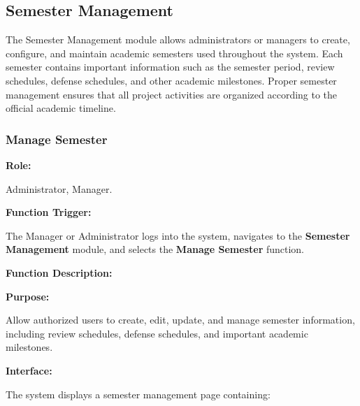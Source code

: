 
\subsection{Semester Management}

The Semester Management module allows administrators or managers to create, configure, and maintain academic semesters used throughout the system. Each semester contains important information such as the semester period, review schedules, defense schedules, and other academic milestones. Proper semester management ensures that all project activities are organized according to the official academic timeline.

\subsubsection{Manage Semester}

\textbf{Role:}

Administrator, Manager.

\vspace{0.3cm}

\textbf{Function Trigger:}

The Manager or Administrator logs into the system, navigates to the \textbf{Semester Management} module, and selects the \textbf{Manage Semester} function.

\vspace{0.3cm}

\textbf{Function Description:}

\textbf{Purpose:}

Allow authorized users to create, edit, update, and manage semester information, including review schedules, defense schedules, and important academic milestones.

\vspace{0.2cm}

\textbf{Interface:}

The system displays a semester management page containing:

